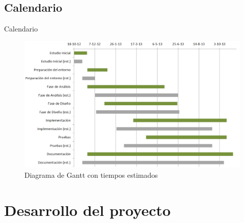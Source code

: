 \documentclass[spanish,xcolor=table,svgnames]{beamer}
\begin{document}
\subsection*{Calendario}
\begin{frame}{Calendario}
  \begin{center}
    \begin{figure}[H]
      \begin{center}
          \includegraphics[width=1.0\textwidth]{img/diagrama_gantt.png}
      \end{center}
      \caption{Diagrama de Gantt con tiempos estimados}
      \label{fig:gantt}
    \end{figure}
  \end{center}
\end{frame}


\section{Desarrollo del proyecto}
\end{document}
